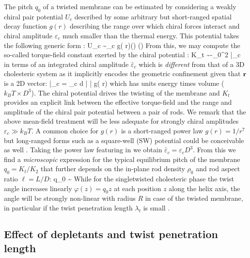 The pitch $q_{0}$ of a twisted membrane can be estimated by considering a weakly chiral pair potential $U_{c}$ described by some arbitrary but short-ranged spatial decay function $g(r)$ describing the range over which chiral forces interact and chiral amplitude $\varepsilon_{c} $ much smaller than the thermal energy. This potential takes the following generic form \cite{goossens1971}:
\beq
U_{c} \sim  \varepsilon_{c} g( r)(\bwa \times \bwb \cdot   \bx) (\bwa \cdot \bwb)
\label{uchi}
\eeq
From this, we may compute the so-called torque-field constant exerted by the chiral potential \cite{wensink2018elastic}:
\beq
K_{t}   \sim -\rho_{0}^{2}  \bar{\varepsilon}_{c} 
\eeq
in terms of an integrated chiral amplitude  $\bar{\varepsilon}_{c}$ which is  {\em different} from that of a  3D cholesteric system as it implicitly encodes the geometric confinement given that ${\bf r}$ is a 2D vector:
\beq
 \bar{\varepsilon}_{c}  =  \varepsilon_{c} \int d \bdr | \bdr \cdot \bx |    g( r)
 \eeq
 which has units energy times volume ($k_{B}T \times D^{3}$). The chiral potential drives the twisting of the membrane and $K_{t}$  provides an explicit link between the effective torque-field and the range and amplitude  of the chiral pair potential between a pair of  rods. We remark that the above mean-field treatment will be less adequate for strongly chiral amplitudes $\varepsilon_{c} \gg k_{B}T$. A common choice for $g(r)$ is a short-ranged power law $g(r) = 1/r^{7}$ but  long-ranged forms such as a square-well (SW) potential could be conceivable as well \cite{wensinkjackson}. Taking the power law featuring in  we obtain $\bar{\varepsilon}_{c} = \varepsilon_{c} D^{3}$.  From this we find a {\em microscopic} expression for the typical equilibrium  pitch of the membrane $q_{0} = K_{t}/K_{2}$ that further depends on the in-plane rod density $\rho_{0}$ and rod aspect ratio $\ell = L/D$:
 \beq
 q_{0} \sim {}
 \eeq
 While for the singletwisted cholesteric phase the twist angle increases linearly  $\varphi(z) = q_{0} z$ at each position $z$ along the helix axis, the angle will be strongly non-linear with radius $R$ in case of the twisted membrane, in particular if the twist penetration length $\lambda_{t}$ is small \cite{wensink2018elastic}.   
 


\subsection{Effect of depletants and twist penetration length}

